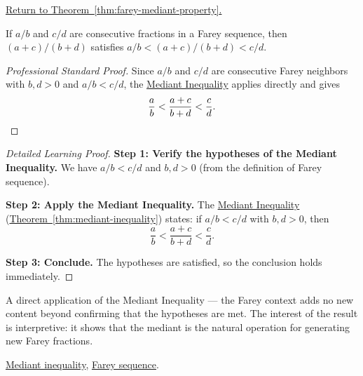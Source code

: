
\newpage
{}
\label{prf:farey-mediant-property}

\begin{remark*}[Return]
\hyperref[thm:farey-mediant-property]{Return to Theorem~\ref*{thm:farey-mediant-property}.}
\end{remark*}

\begin{theorem*}
If $a/b$ and $c/d$ are consecutive fractions in a Farey sequence, then
$(a+c)/(b+d)$ satisfies $a/b < (a+c)/(b+d) < c/d$.
\end{theorem*}

\begin{proof}[Professional Standard Proof]
\LRAProofBodyStart
Since $a/b$ and $c/d$ are consecutive Farey neighbors with $b,d > 0$ and
$a/b < c/d$, the \hyperref[thm:mediant-inequality]{Mediant Inequality}
applies directly and gives
\[
\frac{a}{b} < \frac{a+c}{b+d} < \frac{c}{d}.
\qedhere
\]
\end{proof}

\begin{proof}[Detailed Learning Proof]
\LRAProofBodyStart
\textbf{Step 1: Verify the hypotheses of the Mediant Inequality.}
We have $a/b < c/d$ and $b, d > 0$ (from the definition of Farey sequence).

\textbf{Step 2: Apply the Mediant Inequality.}
The \hyperref[thm:mediant-inequality]{Mediant Inequality}
(\hyperref[thm:mediant-inequality]{Theorem~\ref*{thm:mediant-inequality}})
states: if $a/b < c/d$ with $b,d > 0$, then
\[
\frac{a}{b} < \frac{a+c}{b+d} < \frac{c}{d}.
\]

\textbf{Step 3: Conclude.}
The hypotheses are satisfied, so the conclusion holds immediately.
\end{proof}

\begin{remark*}
A direct application of the Mediant Inequality --- the Farey context adds
no new content beyond confirming that the hypotheses are met.  The
interest of the result is interpretive: it shows that the mediant is
the natural operation for generating new Farey fractions.
\end{remark*}

\begin{dependencies}
\hyperref[thm:mediant-inequality]{Mediant inequality},
\hyperref[def:farey-sequence]{Farey sequence}.
\end{dependencies}

\clearpage
